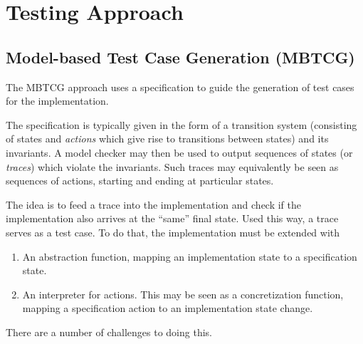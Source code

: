\documentclass[a4paper]{article}
\begin{document}
\section{Testing Approach}

\subsection{Model-based Test Case Generation (MBTCG)}
\label{sec: interpreter}

The MBTCG approach uses a specification to guide the generation of test cases for the implementation.

The specification is typically given in the form of a transition system (consisting of states and \emph{actions} which give rise to transitions between states) and its invariants.
%
A model checker may then be used to output sequences of states (or \emph{traces}) which violate the invariants.
%
Such traces may equivalently be seen as sequences of actions, starting and ending at particular states.

The idea is to feed a trace into the implementation and check if the implementation also arrives at the ``same'' final state. Used this way, a trace serves as a test case.
%
To do that, the implementation must be extended with

\begin{enumerate}
    \item An abstraction function, mapping an implementation state to a specification state.

    \item An interpreter for actions. This may be seen as a concretization function, mapping a specification action to an implementation state change.
\end{enumerate}

There are a number of challenges to doing this.
\end{document}
